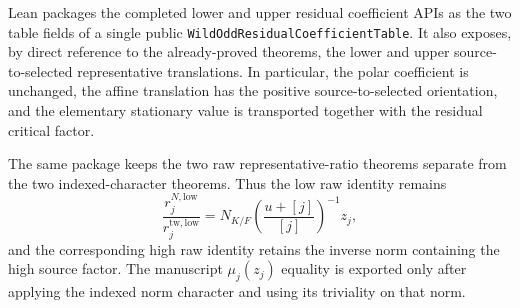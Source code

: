 \begin{theorem}\label{mod:cases-wildodd-residualcoefficients}
Lean packages the completed lower and upper residual coefficient APIs as the
two table fields of a single public
\texttt{WildOddResidualCoefficientTable}.  It also exposes, by direct
reference to the already-proved theorems, the lower and upper
source-to-selected representative translations.  In particular, the polar
coefficient is unchanged, the affine translation has the positive
source-to-selected orientation, and the elementary stationary value is
transported together with the residual critical factor.

The same package keeps the two raw representative-ratio theorems separate
from the two indexed-character theorems.  Thus the low raw identity remains
\[
 \frac{r^{N,\mathrm{low}}_j}{r^{\mathrm{tw},\mathrm{low}}_j}
 =N_{K/F}\!\left(\frac{u+[j]}{[j]}\right)^{-1}z_j,
\]
and the corresponding high raw identity retains the inverse norm containing
the high source factor.  The manuscript $\mu_j(z_j)$ equality is exported
only after applying the indexed norm character and using its triviality on
that norm.


\end{theorem}
